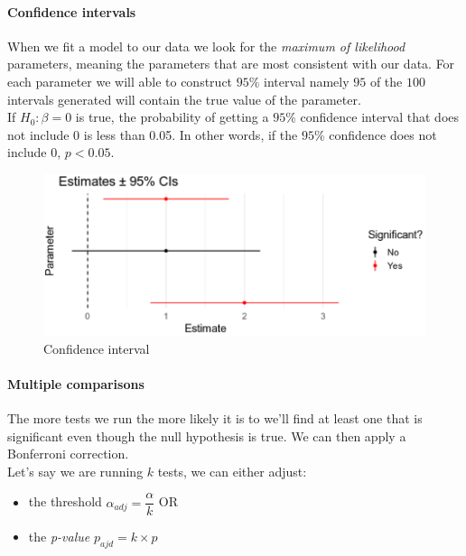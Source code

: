 \paragraph{Confidence intervals}
When we fit a model to our data we look for the \emph{maximum of likelihood} parameters,
meaning the parameters that are most consistent with our data. 
For each parameter we will able to construct $95\%$ interval namely $95$ of the $100$ 
intervals generated will contain the true value of the parameter.\\
If $H_{0}: \beta=0$ is true, the probability of getting a $95\%$ confidence interval that
does not include 0 is less than 0.05. In other words, if the $95\%$ confidence does not 
include 0, $p<0.05$.
\begin{figure}[H]
	\begin{center}
		\includegraphics[width=\textwidth]{./chaps/10sec/images/4_estimates.png}
	\end{center}
	\caption{Confidence interval}
	\label{fig:4_estimates}
\end{figure}

\paragraph{Multiple comparisons}
The more tests we run the more likely it is to we'll find at least one that is significant
even though the null hypothesis is true. We can then apply a Bonferroni correction.\\
Let's say we are running $k$ tests, we can either adjust: 
\begin{itemize}
	\item the threshold $\alpha_{adj} = \dfrac{\alpha}{k}$ OR
	\item the \emph{p-value} $p_{ajd} = k\times p$
\end{itemize}
